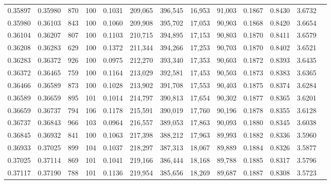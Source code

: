 \begin{tabular}{rrrrrrrrrrrrr}
0.35897 & 0.35980 &   870 & 100 &                                     0.1031 & 209,065 & 396,545 &  16,953 &  91,003 & 0.1867 & 0.8430 & 3.6732 \\
0.35980 & 0.36103 &   843 & 100 &                                     0.1060 & 209,908 & 395,702 &  17,053 &  90,903 & 0.1868 & 0.8420 & 3.6654 \\
0.36104 & 0.36207 &   807 & 100 &                                     0.1103 & 210,715 & 394,895 &  17,153 &  90,803 & 0.1870 & 0.8411 & 3.6579 \\
0.36208 & 0.36283 &   629 & 100 &                                     0.1372 & 211,344 & 394,266 &  17,253 &  90,703 & 0.1870 & 0.8402 & 3.6521 \\
0.36283 & 0.36372 &   926 & 100 &                                     0.0975 & 212,270 & 393,340 &  17,353 &  90,603 & 0.1872 & 0.8393 & 3.6435 \\
0.36372 & 0.36465 &   759 & 100 &                                     0.1164 & 213,029 & 392,581 &  17,453 &  90,503 & 0.1873 & 0.8383 & 3.6365 \\
0.36466 & 0.36589 &   873 & 100 &                                     0.1028 & 213,902 & 391,708 &  17,553 &  90,403 & 0.1875 & 0.8374 & 3.6284 \\
0.36589 & 0.36659 &   895 & 101 &                                     0.1014 & 214,797 & 390,813 &  17,654 &  90,302 & 0.1877 & 0.8365 & 3.6201 \\
0.36659 & 0.36737 &   794 & 106 &                                     0.1178 & 215,591 & 390,019 &  17,760 &  90,196 & 0.1878 & 0.8355 & 3.6128 \\
0.36737 & 0.36843 &   966 & 103 &                                     0.0964 & 216,557 & 389,053 &  17,863 &  90,093 & 0.1880 & 0.8345 & 3.6038 \\
0.36845 & 0.36932 &   841 & 100 &                                     0.1063 & 217,398 & 388,212 &  17,963 &  89,993 & 0.1882 & 0.8336 & 3.5960 \\
0.36933 & 0.37025 &   899 & 104 &                                     0.1037 & 218,297 & 387,313 &  18,067 &  89,889 & 0.1884 & 0.8326 & 3.5877 \\
0.37025 & 0.37114 &   869 & 101 &                                     0.1041 & 219,166 & 386,444 &  18,168 &  89,788 & 0.1885 & 0.8317 & 3.5796 \\
0.37117 & 0.37190 &   788 & 101 &                                     0.1136 & 219,954 & 385,656 &  18,269 &  89,687 & 0.1887 & 0.8308 & 3.5723 \\

\end{tabular}
